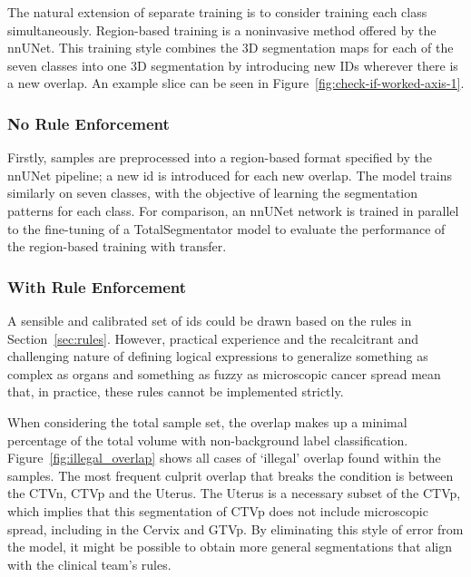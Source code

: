 \documentclass[11pt,twoside]{report}
\begin{document}
The natural extension of separate training is to consider training each class simultaneously. Region-based training is a noninvasive method offered by the nnUNet. This training style combines the 3D segmentation maps for each of the seven classes into one 3D segmentation by introducing new IDs wherever there is a new overlap. An example slice can be seen in Figure~\ref{fig:check-if-worked-axis-1}.

\subsubsection{No Rule Enforcement}

Firstly, samples are preprocessed into a region-based format specified by the nnUNet pipeline; a new id is introduced for each new overlap. The model trains similarly on seven classes, with the objective of learning the segmentation patterns for each class. For comparison, an nnUNet network is trained in parallel to the fine-tuning of a TotalSegmentator model to evaluate the performance of the region-based training with transfer.

\subsubsection{With Rule Enforcement}

A sensible and calibrated set of ids could be drawn based on the rules in Section~\ref{sec:rules}. However, practical experience and the recalcitrant and challenging nature of defining logical expressions to generalize something as complex as organs and something as fuzzy as microscopic cancer spread mean that, in practice, these rules cannot be implemented strictly.

When considering the total sample set, the overlap makes up a minimal percentage of the total volume with non-background label classification. Figure~\ref{fig:illegal_overlap} shows all cases of `illegal' overlap found within the samples. The most frequent culprit overlap that breaks the condition is between the CTVn, CTVp and the Uterus. The Uterus is a necessary subset of the CTVp, which implies that this segmentation of CTVp does not include microscopic spread, including in the Cervix and GTVp. By eliminating this style of error from the model, it might be possible to obtain more general segmentations that align with the clinical team's rules.

\end{document}
